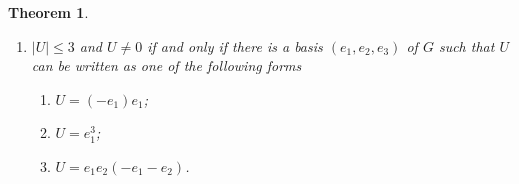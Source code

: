 \documentclass[a4paper, 10pt]{amsart}
\theoremstyle{plain}
\newtheorem{theorem}{\bf Theorem}[section]
\theoremstyle{definition}
\theoremstyle{definition}
\numberwithin{equation}{section}
\begin{document}
\begin{theorem}
\begin{enumerate}
\begin{enumerate}
	  \item $U=e_1e_2e_3(-e_1-e_2-e_3)$.
	  \end{enumerate}

\item $|U| \le 3$ and $U \ne 0$  if and only if there is a basis $(e_1,e_2,e_3)$ of $G$ such that $U$ can be written as one of the following forms
	  \begin{enumerate}
	  \item $U=(-e_1)e_1$;

	  \item $U=e_1^3$;

	  \item $U=e_1e_2(-e_1-e_2)$.
	  \end{enumerate}
\end{enumerate}
\end{theorem}
\end{document}
